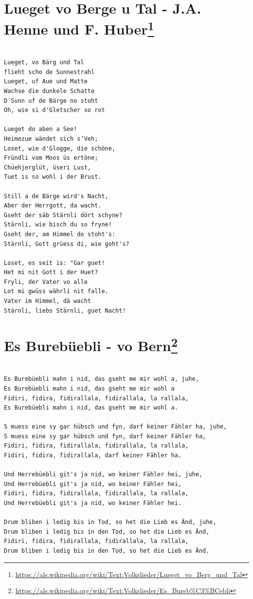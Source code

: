 \documentclass[
]{book}
\let\stdsection\section
\renewcommand\section{\clearpage\stdsection}
\begin{document}
\hypertarget{volsklieder-lueged-vo-berge-u-tal}{%
\section[Lueget vo Berge u Tal - J.A. Henne und F. Huber]{\texorpdfstring{Lueget vo Berge u Tal - J.A. Henne und F. Huber\footnote{\url{https://als.wikipedia.org/wiki/Text:Volkslieder/Lueget_vo_Berg_und_Tal}}}{Lueget vo Berge u Tal - J.A. Henne und F. Huber}}\label{volsklieder-lueged-vo-berge-u-tal}}

\begin{verbatim}

Lueget, vo Bärg und Tal
flieht scho de Sunnestrahl
Lueget, uf Aue und Matte
Wachse die dunkele Schatte
D´Sunn uf de Bärge no stoht
Oh, wie si d'Gletscher so rot

Lueget do aben a See!
Heimezue wändet sich s’Veh;
Loset, wie d'Glogge, die schöne,
Fründli vom Moos üs ertöne;
Chüehjerglüt, üseri Lust,
Tuet is so wohl i der Brust.

Still a de Bärge wird's Nacht,
Aber der Herrgott, da wacht.
Gseht der säb Stärnli dört schyne?
Stärnli, wie bisch du so fryne!
Gseht der, am Himmel do stoht's:
Stärnli, Gott grüess di, wie goht's?

Loset, es seit is: "Gar guet!
Het mi nit Gott i der Huet?
Fryli, der Vater vo alle
Lot mi gwüss währli nit falle.
Vater im Himmel, dä wacht
Stärnli, liebs Stärnli, guet Nacht! 
\end{verbatim}

\hypertarget{volsklieder-es-burebuebli}{%
\section[Es Burebüebli - vo Bern]{\texorpdfstring{Es Burebüebli - vo Bern\footnote{\url{https://als.wikipedia.org/wiki/Text:Volkslieder/Es_Bureb\%C3\%BCebli}}}{Es Burebüebli - vo Bern}}\label{volsklieder-es-burebuebli}}

\begin{verbatim}

Es Burebüebli mahn i nid, das gseht me mir wohl a, juhe,
Es Burebüebli mahn i nid, das gseht me mir wohl a
Fidiri, fidira, fidirallala, fidirallala, la rallala,
Es Burebüebli mahn i nid, das gseht me mir wohl a.

S muess eine sy gar hübsch und fyn, darf keiner Fähler ha, juhe,
S muess eine sy gar hübsch und fyn, darf keiner Fähler ha,
Fidiri, fidira, fidirallala, fidirallala, la rallala,
Fidiri, fidira, fidirallala, darf keiner Fähler ha.

Und Herrebüebli git's ja nid, wo keiner Fähler hei, juhe,
Und Herrebüebli git's ja nid, wo keiner Fähler hei,
Fidiri, fidira, fidirallala, fidirallala, la rallala,
Und Herrebüebli git's ja nid, wo keiner Fähler hei.

Drum bliben i ledig bis in Tod, so het die Lieb es Änd, juhe,
Drum bliben i ledig bis in den Tod, so het die Lieb es Änd,
Fidiri, fidira, fidirallala, fidirallala, la rallala,
Drum bliben i ledig bis in den Tod, so het die Lieb es Änd.
\end{verbatim}
\end{document}
